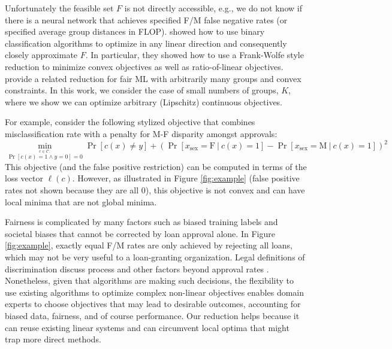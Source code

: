 \documentclass[final, 12pt]{colt2018} %
\def\calC{\mathcal{C}}
\begin{document}
Unfortunately the feasible set $F$ is not directly accessible, e.g., we do not know if there is a neural network that achieves specified F/M false negative rates (or specified average group distances in FLOP). \cite{NarasimhanRS015} showed how to use binary classification algorithms to optimize in any linear direction and consequently closely approximate $F$. In particular, they showed how to use a Frank-Wolfe style reduction to minimize convex objectives as well as ratio-of-linear objectives. \cite{Agarwal17,Agarwal18} provide a related reduction for fair ML with arbitrarily many groups and convex constraints. In this work, we consider the case of small numbers of groups, $K$, where we show we can optimize arbitrary (Lipschitz) continuous objectives.

For example, consider the following stylized objective that combines misclassification rate with a penalty for M-F disparity amongst approvals:
\begin{equation}\label{eq:example-obj}
\min_{\stackrel{c \in \calC:}{\Pr[c(x)=1\wedge y=0] =0}} \Pr[c(x)\neq y] + \left(\Pr\left[x_{\text{sex}}=\text{F} ~\bigl|~c(x)=1\right]-\Pr\left[x_{\text{sex}}=\text{M} ~\bigl|~c(x)=1\right]\right)^2
\end{equation}
This objective (and the false positive restriction) can be computed in terms of the loss vector $\ell(c)$. However, as illustrated in Figure \ref{fig:example} (false positive rates not shown because they are all 0), this objective is not convex and can have local minima that are not global minima. 

Fairness is complicated by many factors such as biased training labels and societal biases that cannot be corrected by loan approval alone. In Figure \ref{fig:example}, exactly equal F/M rates are only achieved by rejecting all loans, which may not be very useful to a loan-granting organization. Legal definitions of discrimination discuss process and other factors beyond approval rates \citep{Barocas2016}. Nonetheless, given that algorithms are making such decisions, the flexibility to use existing algorithms to optimize complex non-linear objectives enables domain experts to choose objectives that may lead to desirable outcomes, accounting for biased data, fairness, and of course performance. Our reduction helps because it can reuse existing linear systems and can circumvent local optima that might trap more direct methods.
\end{document}
